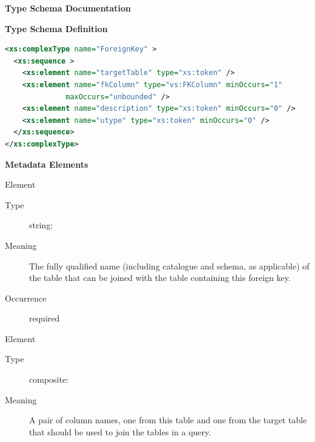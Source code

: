 \documentclass[11pt,a4paper]{ivoa}
\begin{document}
\begin{generated}
\begingroup
        \renewcommand*\descriptionlabel[1]{%
        \hbox to 5.5em{\emph{#1}\hfil}}\vspace{2ex}\noindent\textbf{ Type Schema Documentation}



\vspace{1ex}\noindent\textbf{ Type Schema Definition}

\begin{lstlisting}[language=XML,basicstyle=\footnotesize]
<xs:complexType name="ForeignKey" >
  <xs:sequence >
    <xs:element name="targetTable" type="xs:token" />
    <xs:element name="fkColumn" type="vs:FKColumn" minOccurs="1"
              maxOccurs="unbounded" />
    <xs:element name="description" type="xs:token" minOccurs="0" />
    <xs:element name="utype" type="xs:token" minOccurs="0" />
  </xs:sequence>
</xs:complexType>
\end{lstlisting}

\vspace{0.5ex}\noindent\textbf{ Metadata Elements}

\begingroup\small\begin{bigdescription}\item[Element \xmlel{targetTable}]
\begin{description}
\item[Type] string: 
\item[Meaning]
               The fully qualified name (including catalogue and schema, as
               applicable) of the table that can be joined with the
               table containing this foreign key.

\item[Occurrence] required

\end{description}
\item[Element \xmlel{fkColumn}]
\begin{description}
\item[Type] composite: 
\item[Meaning]
               A pair of column names, one from this table and one
               from the target table that should be used to join the
               tables in a query.


\end{description}
\end{bigdescription}
\end{generated}
\end{document}
